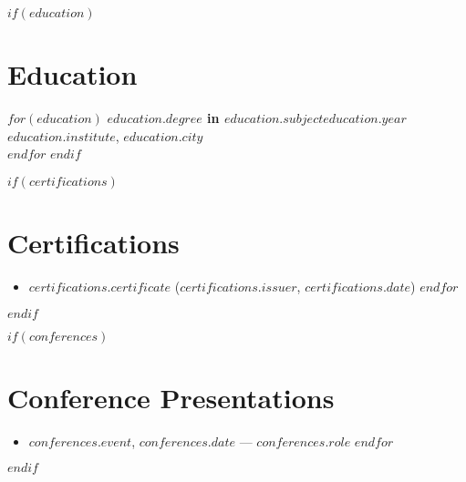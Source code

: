 \documentclass[11pt,a4paper]{article}
\begin{document}
$if(education)$
\section*{Education}
$for(education)$
  \noindent\textbf{$education.degree$ in $education.subject$}\hfill$education.year$\\
  $education.institute$, $education.city$\\[0.3cm]
$endfor$
$endif$

$if(certifications)$
\section*{Certifications}
\begin{itemize}
$for(certifications)$
  \item \textbf{$certifications.certificate$} (\emph{$certifications.issuer$}, $certifications.date$)
$endfor$
\end{itemize}
$endif$

$if(conferences)$
\section*{Conference Presentations}
\begin{itemize}
$for(conferences)$
  \item \textbf{$conferences.event$}, $conferences.date$ — \emph{$conferences.role$}
$endfor$
\end{itemize}
$endif$
\end{document}
